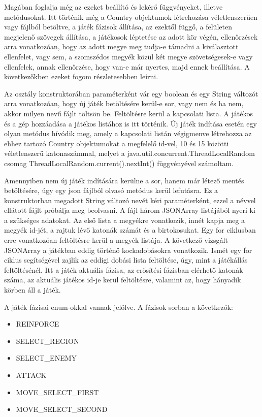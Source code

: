 Magában foglalja még az ezeket beállító és lekérő függvényeket, illetve metódusokat. Itt történik még a Country objektumok létrehozása véletlenszerűen vagy fájlból betöltve, a játék fázisok állítása, az ezektől függő, a felületen megjelenő szövegek állítása, a játékosok léptetése az adott kör végén, ellenőrzések arra vonatkozóan, hogy az adott megye meg tudja-e támadni a kiválasztott ellenfelet, vagy sem, a szomszédos megyék közül két megye szövetségesek-e vagy ellenfelek, annak ellenőrzése, hogy van-e már nyertes, majd ennek beállítása. A következőkben ezeket fogom részletesebben leírni. 

Az osztály konstruktorában paraméterként vár egy boolean és egy String változót arra vonatkozóan, hogy új játék betöltésére kerül-e sor, vagy nem és ha nem, akkor milyen nevű fájlt töltsön be. Feltöltésre kerül a kapcsolati lista. A játékos és a gép hozzáadása a játékos listához is itt történik. Új játék indítása esetén egy olyan metódus hívódik meg, amely a kapcsolati listán végigmenve létrehozza az ehhez tartozó Country objektumokat a megfelelő id-vel, 10 és 15 közötti véletlenszerű katonaszámmal, melyet a java.util.concurrent.ThreadLocalRandom csomag ThreadLocalRandom.current().nextInt() függvényével számoltam. 

Amennyiben nem új játék indítására kerülne a sor, hanem már létező mentés betöltésére, úgy egy json fájlból olvasó metódus kerül lefutásra. Ez a konstruktorban megadott String változó nevét kéri paraméterként, ezzel a névvel ellátott fájlt próbálja meg beolvasni. A fájl három JSONArray listájából nyeri ki a szükséges adatokat. Az első lista a megyékre vonatkozik, innét kapja meg a megyék id-jét, a rajtuk lévő katonák számát és a birtokosukat. Egy for ciklusban erre vonatkozóan feltöltésre kerül a megyék listája. A következő vizsgált JSONArray a játékban eddig történő kockadobásokra vonatkozik. Ismét egy for ciklus segítségével zajlik az eddigi dobási lista feltöltése, úgy, mint a játékállás feltöltésénél. Itt a játék aktuális fázisa, az erősítési fázisban elérhető katonák száma, az aktuális játékos id-je kerül feltöltésre, valamint az, hogy hányadik körben áll a játék. 

A játék fázisai enum-okkal vannak jelölve. A fázisok sorban a következők: 

\begin{itemize}
\item REINFORCE 
\item SELECT\_REGION 
\item SELECT\_ENEMY
\item ATTACK 
\item MOVE\_SELECT\_FIRST 
\item MOVE\_SELECT\_SECOND
\end{itemize}

